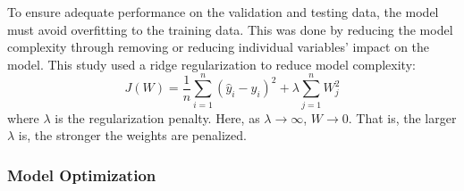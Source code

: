 To ensure adequate performance on the validation and testing data, the model must avoid overfitting to the training data.  This was done by reducing the model complexity through removing or reducing individual variables' impact on the model.  This study used a ridge regularization to reduce model complexity:
\begin{equation}
    J(W) = \frac{1}{n}\sum\limits^n_{i=1}(\hat{y}_i - y_i)^2 + \lambda \sum\limits^n_{j=1} W_j^2
    \label{eq:08MSE_wR}
\end{equation}
where $\lambda$ is the regularization penalty.  Here, as $\lambda \rightarrow \infty$, $W \rightarrow 0$.  That is, the larger $\lambda$ is, the stronger the weights are penalized. 

\subsubsection{Model Optimization}

